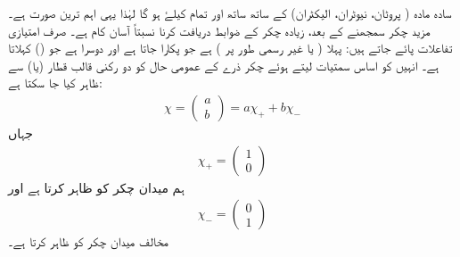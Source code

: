 سادہ مادہ ( پروٹان،  نیوٹران،  الیکٹران)  کے ساتھ ساتھ   اور تمام   کیلۓ    ہو گا  لہٰذا یہی   اہم ترین صورت ہے۔ مزید چکر سمجھنے کے بعد،  زیادہ چکر کے ضوابط  دریافت کرنا نسبتاً   آسان  کام ہے۔  صرف     امتیازی تفاعلات  پائے جاتے ہیں:  پہلا   ( یا غیر رسمی طور پر  ) ہے جو   پکارا جاتا ہے   اور دوسرا  ہے جو   () کہلاتا ہے۔ انہیں کو  اساس سمتیات لیتے   ہوئے     چکر ذرے  کے عمومی حال کو دو  رکنی  قالب قطار   (یا) سے ظاہر کیا جا سکتا ہے:
\begin{align}\label{مساوات_تین_بعدی_عمومی_حال_چائے}
 \chi=\begin{pmatrix} a \\ b \end{pmatrix}= a\chi_{+} + b\chi_{-} 
 \end{align}
جہاں
\begin{align} 
 \chi_{+}=\begin{pmatrix}1\\0 \end{pmatrix}
 \end{align}
ہم میدان چکر  کو ظاہر کرتا ہے اور  
\begin{align} 
 \chi_{-}=\begin{pmatrix}0 \\1 \end{pmatrix}
 \end{align}
مخالف میدان چکر کو ظاہر کرتا ہے۔

